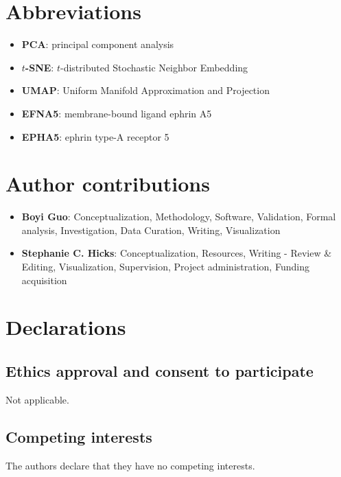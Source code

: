 \documentclass[10pt,twocolumn]{article}
\begin{document}




\section*{Abbreviations}

\begin{itemize}[nosep]
    \item \textbf{PCA}: principal component analysis
    \item \textbf{$t$-SNE}: $t$-distributed Stochastic Neighbor Embedding
    \item \textbf{UMAP}: Uniform Manifold Approximation and Projection
    \item \textbf{EFNA5}: membrane-bound ligand ephrin A5
    \item \textbf{EPHA5}: ephrin type-A receptor 5
\end{itemize}

\section*{Author contributions}

\begin{itemize}[nosep]
    \item \textbf{Boyi Guo}:  Conceptualization, Methodology, Software, Validation, Formal analysis, Investigation, Data Curation, Writing, Visualization
    \item \textbf{Stephanie C. Hicks}: Conceptualization, Resources, Writing - Review \& Editing, Visualization, Supervision, Project administration, Funding acquisition
\end{itemize}

\section*{Declarations}

\subsection*{Ethics approval and consent to participate}
Not applicable.

\subsection*{Competing interests}
The authors declare that they have no competing interests.
\end{document}
